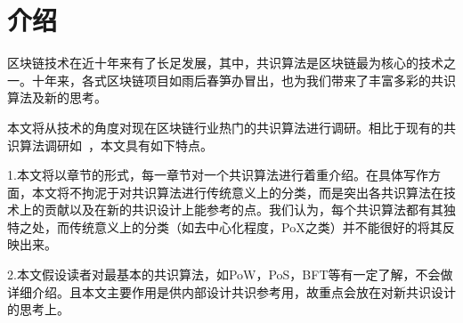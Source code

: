\section{介绍}
区块链技术在近十年来有了长足发展，其中，共识算法是区块链最为核心的技术之一。十年来，各式区块链项目如雨后春笋办冒出，也为我们带来了丰富多彩的共识算法及新的思考。

本文将从技术的角度对现在区块链行业热门的共识算法进行调研。相比于现有的共识算法调研如~\cite{wang2019survey,袁勇2018区块链共识算法的发展现状与展望}，本文具有如下特点。

1.本文将以章节的形式，每一章节对一个共识算法进行着重介绍。在具体写作方面，本文将不拘泥于对共识算法进行传统意义上的分类，而是突出各共识算法在技术上的贡献以及在新的共识设计上能参考的点。我们认为，每个共识算法都有其独特之处，而传统意义上的分类（如去中心化程度，PoX之类）并不能很好的将其反映出来。

2.本文假设读者对最基本的共识算法，如PoW，PoS，BFT等有一定了解，不会做详细介绍。且本文主要作用是供内部设计共识参考用，故重点会放在对新共识设计的思考上。